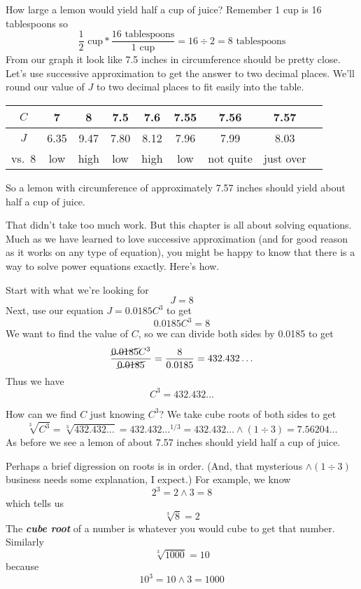 How large a lemon would yield half a cup of juice?  Remember 1 cup is 16 tablespoons so $$\frac{1}{2} \text{ cup} \ast \frac{16 \text{ tablespoons}}{1 \text{ cup}} = 16 \div 2 = 8 \text{ tablespoons}$$ From our graph it look like 7.5 inches in circumference should be pretty close.  Let's use successive approximation to get the answer to two decimal places. We'll round our value of $J$ to two decimal places to fit easily into the table.

\begin{center}
\begin{tabular} {|c |c |c |c |c |c |c |c |c|}\hline
$C$ & 7 & 8 &7.5 & 7.6 & 7.55 & 7.56 & 7.57 \\ \hline
$J$ & 6.35 & 9.47 & 7.80 & 8.12 & 7.96 & 7.99 & 8.03 \\ \hline
vs.\ 8 & low & high & low & high & low &not quite & just over \\ \hline
\end{tabular}
\end{center}

\noindent So a lemon with circumference of approximately 7.57 inches should yield about half a cup of juice.

That didn't take too much work.  But this chapter is all about solving equations.   Much as we have learned to love successive approximation (and for good reason as it works on any type of equation), you might be happy to know that there is a way to solve power equations exactly.  Here's how.  %

Start with what we're looking for $$J = 8$$ Next, use our equation $J=0.0185C^3$ to get $$0.0185C^3=8$$ We want to find the value of $C$, so we can divide both sides by 0.0185 to get $$\frac{\cancel{0.0185}C^3}{\cancel{0.0185}}=\frac{8}{0.0185}=432.432\ldots$$  Thus we have $$C^3 = 432.432\ldots$$ 

How can we find $C$ just knowing $C^3$?  We take cube roots of both sides to get $$\sqrt[3]{C^3} = \sqrt[3]{432.432\ldots}= 432.432\ldots^{1/3}=432.432\ldots \wedge ( 1 \div 3)= 7.56204\ldots $$   As before we see a lemon of about 7.57 inches should yield half a cup of juice.

Perhaps a brief digression on roots is in order.  (And, that mysterious $\wedge (1\div3)$ business needs some explanation, I expect.) For example, we know $$2^3=2 \wedge 3=8$$ which tells us $$\sqrt[3]{8}=2$$ The \emph{\textbf{cube root}} of a number is whatever you would cube to get that number.  Similarly $$\sqrt[3]{1000} = 10$$ because $$10^3=10 \wedge 3 = 1000$$ 

